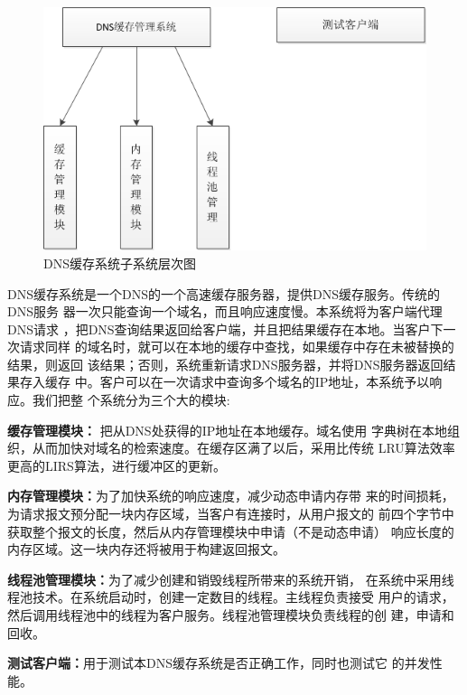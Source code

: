 \documentclass[12pt, a4paper, titlepage]{article}
\begin{document}
\begin{figure}[H]
\centering
\includegraphics[keepaspectratio, scale=0.9]{pitures/zixitongcengcitu.png}
\caption{DNS缓存系统子系统层次图}
\end{figure}
\indent DNS缓存系统是一个DNS的一个高速缓存服务器，提供DNS缓存服务。传统的DNS服务
	器一次只能查询一个域名，而且响应速度慢。本系统将为客户端代理DNS请求
	，把DNS查询结果返回给客户端，并且把结果缓存在本地。当客户下一次请求同样
	的域名时，就可以在本地的缓存中查找，如果缓存中存在未被替换的结果，则返回
	该结果；否则，系统重新请求DNS服务器，并将DNS服务器返回结果存入缓存
	中。客户可以在一次请求中查询多个域名的IP地址，本系统予以响应。我们把整
	个系统分为三个大的模块:
	\begin{compactitem}
	\item{\textbf{缓存管理模块：} 把从DNS处获得的IP地址在本地缓存。域名使用
	字典树\cite{IDAT}在本地组织，从而加快对域名的检索速度。在缓存区满了以后，采用比传统
	LRU算法效率更高的LIRS\cite{LIRS}算法，进行缓冲区的更新。}
	\item{\textbf{内存管理模块：}为了加快系统的响应速度，减少动态申请内存带
	来的时间损耗，为请求报文预分配一块内存区域，当客户有连接时，从用户报文的
	前四个字节中获取整个报文的长度，然后从内存管理模块中申请（不是动态申请）
	响应长度的内存区域。这一块内存还将被用于构建返回报文。}
	\item{\textbf{线程池管理模块：}为了减少创建和销毁线程所带来的系统开销，
	在系统中采用线程池技术。在系统启动时，创建一定数目的线程。主线程负责接受
	用户的请求，然后调用线程池中的线程为客户服务。线程池管理模块负责线程的创
	建，申请和回收。}
	\item{\textbf{测试客户端：}用于测试本DNS缓存系统是否正确工作，同时也测试它
	的并发性能。}
	\end{compactitem}
\end{document}
